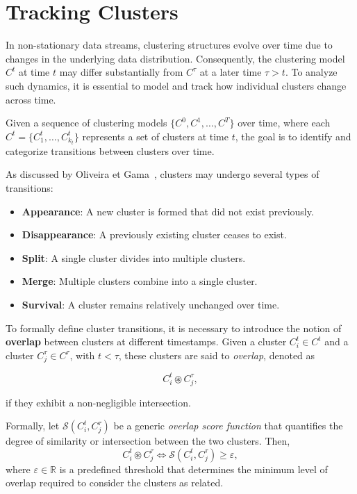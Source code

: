 \section{Tracking Clusters}\label{sec:prob_tracking_clusters}
In non-stationary data streams, clustering structures evolve over time due to
changes in the underlying data distribution. Consequently, the clustering model
$C^t$ at time $t$ may differ substantially from $C^\tau$ at a later time $\tau
    > t$. To analyze such dynamics, it is essential to model and track how
individual clusters change across time.

Given a sequence of clustering models $\{C^0, C^1, \dots, C^T\}$ over time,
where each $C^t = \{C_1^t, \dots, C_{k_t}^t\}$ represents a set of clusters at
time $t$, the goal is to identify and categorize transitions between clusters
over time.

As discussed by Oliveira et Gama~\cite{mec}, clusters may undergo several types
of transitions:

\begin{itemize}
    \item \textbf{Appearance}: A new cluster is formed that did not exist previously.
    \item \textbf{Disappearance}: A previously existing cluster ceases to exist.
    \item \textbf{Split}: A single cluster divides into multiple clusters.
    \item \textbf{Merge}: Multiple clusters combine into a single cluster.
    \item \textbf{Survival}: A cluster remains relatively unchanged over time.
\end{itemize}

To formally define cluster transitions, it is necessary to introduce the notion
of \textbf{overlap} between clusters at different timestamps. Given a cluster $
    C_i^t \in C^t $ and a cluster $ C_j^\tau \in C^\tau $, with $ t < \tau $, these
clusters are said to \emph{overlap}, denoted as

\begin{equation}
    C_i^t \circledast C_j^\tau,
\end{equation}

if they exhibit a non-negligible intersection.

Formally, let $\mathcal{S}(C_i^t, C_j^{\tau})$ be a generic \emph{overlap score
    function} that quantifies the degree of similarity or intersection between the
two clusters. Then,
\begin{equation}
    C_i^t \circledast C_j^\tau \iff \mathcal{S}(C_i^t, C_j^{\tau}) \ge \varepsilon,
\end{equation}
where $\varepsilon \in \mathbb{R}$ is a predefined threshold that determines the
minimum level of overlap required to consider the clusters as related.

